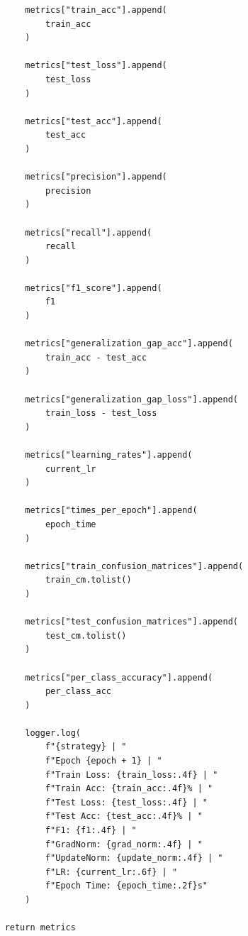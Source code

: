 \begin{verbatim}
        metrics["train_acc"].append(
            train_acc
        )

        metrics["test_loss"].append(
            test_loss
        )

        metrics["test_acc"].append(
            test_acc
        )

        metrics["precision"].append(
            precision
        )

        metrics["recall"].append(
            recall
        )

        metrics["f1_score"].append(
            f1
        )

        metrics["generalization_gap_acc"].append(
            train_acc - test_acc
        )

        metrics["generalization_gap_loss"].append(
            train_loss - test_loss
        )

        metrics["learning_rates"].append(
            current_lr
        )

        metrics["times_per_epoch"].append(
            epoch_time
        )

        metrics["train_confusion_matrices"].append(
            train_cm.tolist()
        )

        metrics["test_confusion_matrices"].append(
            test_cm.tolist()
        )

        metrics["per_class_accuracy"].append(
            per_class_acc
        )

        logger.log(
            f"{strategy} | "
            f"Epoch {epoch + 1} | "
            f"Train Loss: {train_loss:.4f} | "
            f"Train Acc: {train_acc:.4f}% | "
            f"Test Loss: {test_loss:.4f} | "
            f"Test Acc: {test_acc:.4f}% | "
            f"F1: {f1:.4f} | "
            f"GradNorm: {grad_norm:.4f} | "
            f"UpdateNorm: {update_norm:.4f} | "
            f"LR: {current_lr:.6f} | "
            f"Epoch Time: {epoch_time:.2f}s"
        )

    return metrics
\end{verbatim}
